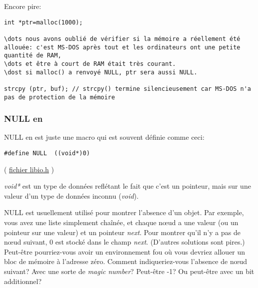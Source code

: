 Encore pire:

\begin{lstlisting}[style=customc]
int *ptr=malloc(1000);

\dots nous avons oublié de vérifier si la mémoire a réellement été allouée: c'est MS-DOS après tout et les ordinateurs ont une petite quantité de RAM,
\dots et être à court de RAM était très courant.
\dost si malloc() a renvoyé NULL, ptr sera aussi NULL.

strcpy (ptr, buf); // strcpy() termine silencieusement car MS-DOS n'a pas de protection de la mémoire
\end{lstlisting}

%
%
% 

\subsubsection{NULL en \CCpp}

NULL en \CCpp est juste une macro qui est souvent définie comme ceci:

\begin{lstlisting}[style=customc]
#define NULL  ((void*)0)
\end{lstlisting}
( \href{https://github.com/wzhy90/linaro_toolchains/blob/8ff8ae680bac04558d10cc9626e12c4c2f6c1348/arm-cortex_a15-linux-gnueabihf/libc/usr/include/libio.h#L70}{fichier libio.h} )

\emph{void*} est un type de données reflétant le fait que c'est un pointeur, mais sur
une valeur d'un type de données inconnu (\emph{void}).

NULL est usuellement utilisé pour montrer l'absence d'un objet.
Par exemple, vous avez une liste simplement chaînée, et chaque n\oe{}ud a une valeur
(ou un pointeur sur une valeur) et un pointeur \emph{next}.
Pour montrer qu'il n'y a pas de n\oe{}ud suivant, 0 est stocké dans le champ \emph{next}.
(D'autres solutions sont pires.)
Peut-être pourriez-vous avoir un environnement fou où vous devriez allouer un bloc
de mémoire à l'adresse zéro. Comment indiqueriez-vous l'absence de n\oe{}ud suivant?
Avec une sorte de \emph{magic number}? Peut-être -1? Ou peut-être avec un bit additionnel?

